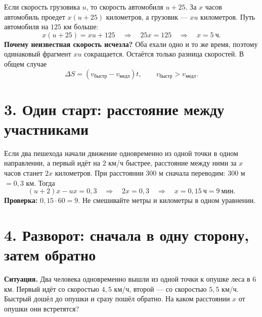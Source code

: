 \documentclass[a4paper,12pt]{article}
\newcommand{\key}[1]{\textcolor{darkaccent}{\textbf{#1}}}
\begin{document}
\begin{center}
\end{center}

Если скорость грузовика $u$, то скорость автомобиля $u+25$. За $x$ часов автомобиль проедет $x(u+25)$ километров, а грузовик --- $xu$ километров. Путь автомобиля на $125$ км больше:
\[
x(u+25)=xu+125 \quad\Longrightarrow\quad 25x=125 \quad\Longrightarrow\quad \boxed{x=5\ \text{ч}}.
\]
\key{Почему неизвестная скорость исчезла?} Оба ехали одно и то же время, поэтому одинаковый фрагмент $xu$ сокращается. Остаётся только разница скоростей. В общем случае
\[
\boxed{\Delta S=(v_{\text{быстр}}-v_{\text{медл}})t},\qquad v_{\text{быстр}}>v_{\text{медл}}.
\]

\section*{3. Один старт: расстояние между участниками}

Если два пешехода начали движение одновременно из одной точки в одном направлении, а первый идёт на $2$ км/ч быстрее, расстояние между ними за $x$ часов станет $2x$ километров. При расстоянии $300$ м сначала переводим: $300$ м $=0{,}3$ км. Тогда
\[
(u+2)x-ux=0{,}3\quad\Longrightarrow\quad 2x=0{,}3
\quad\Longrightarrow\quad x=0{,}15\ \text{ч}=\boxed{9\ \text{мин}}.
\]
\key{Проверка:} $0{,}15\cdot60=9$. Не смешивайте метры и километры в одном уравнении.

\clearpage
\section*{4. Разворот: сначала в одну сторону, затем обратно}

\textbf{Ситуация.} Два человека одновременно вышли из одной точки к опушке леса в $6$ км. Первый идёт со скоростью $4{,}5$ км/ч, второй --- со скоростью $5{,}5$ км/ч. Быстрый дошёл до опушки и сразу пошёл обратно. На каком расстоянии $x$ от опушки они встретятся?
\end{document}
